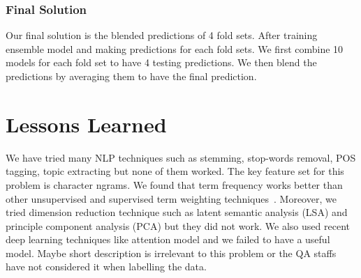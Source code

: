 \documentclass[sigconf]{acmart}
\begin{document}
\subsubsection{Final Solution}
Our final solution is the blended predictions of 4 fold sets. After training ensemble model and making predictions for each fold sets. We first combine 10 models for each fold set to have 4 testing predictions. We then blend the predictions by averaging them to have the final prediction. 

\section{Lessons Learned}
We have tried many NLP techniques such as stemming, stop-words removal, POS tagging, topic extracting but none of them worked. The key feature set for this problem is character ngrams. We found that term frequency works better than other unsupervised and supervised term weighting techniques~\cite{nguyen11}. Moreover, we tried dimension reduction technique such as latent semantic analysis (LSA) and principle component analysis (PCA) but they did not work. We also used recent deep learning techniques like attention model and we failed to have a useful model. Maybe short description is irrelevant to this problem or the QA staffs have not considered it when labelling the data.
\end{document}
